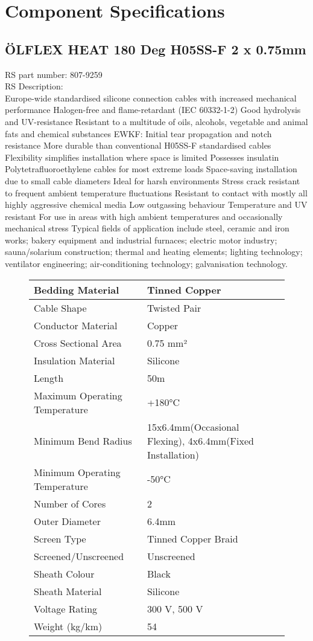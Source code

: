 \chapter{Component Specifications}

\section{ÖLFLEX HEAT 180 Deg H05SS-F 2 x 0.75mm}
RS part number: 807-9259\\
RS Description:\\
Europe-wide standardised silicone connection cables with increased mechanical performance
Halogen-free and flame-retardant (IEC 60332-1-2)
Good hydrolysis and UV-resistance
Resistant to a multitude of oils, alcohols, vegetable and animal fats and chemical substances
EWKF: Initial tear propagation and notch resistance
More durable than conventional H05SS-F standardised cables
Flexibility simplifies installation where space is limited
Possesses insulatin Polytetrafluoroethylene cables for most extreme loads
Space-saving installation due to small cable diameters
Ideal for harsh environments
Stress crack resistant to frequent ambient temperature fluctuations
Resistant to contact with mostly all highly aggressive chemical media
Low outgassing behaviour
Temperature and UV resistant
For use in areas with high ambient temperatures and occasionally mechanical stress
Typical fields of application include steel, ceramic and iron works; bakery equipment and industrial furnaces; electric motor industry; sauna/solarium construction; thermal and heating elements; lighting technology; ventilator engineering; air-conditioning technology; galvanisation technology.

\begin{figure}
\begin{tabular}{|l|l|}
\hline
Bedding Material &	Tinned Copper \\ \hline
Cable Shape &	Twisted Pair\\ \hline
Conductor Material &	Copper\\ \hline
Cross Sectional Area &	0.75 mm²\\ \hline
Insulation Material &	Silicone\\ \hline
Length &	50m\\ \hline
Maximum Operating Temperature &	+180°C\\ \hline
Minimum Bend Radius &	15x6.4mm(Occasional Flexing), 4x6.4mm(Fixed Installation)\\ \hline
Minimum Operating Temperature &	-50°C\\ \hline
Number of Cores &	2\\ \hline
Outer Diameter &	6.4mm\\ \hline
Screen Type &	Tinned Copper Braid\\ \hline
Screened/Unscreened &	Unscreened\\ \hline
Sheath Colour &	Black\\ \hline
Sheath Material &	Silicone\\ \hline
Voltage Rating &	300 V, 500 V\\ \hline
Weight (kg/km) & 54 \\ \hline
\end{tabular}
\end{figure}
